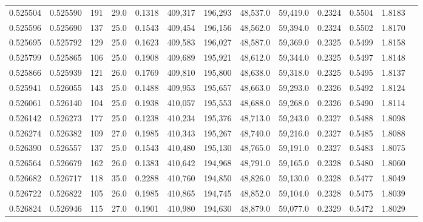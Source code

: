 \begin{tabular}{rrrrrrrrrrrrr}
0.525504 & 0.525590 &   191 & 29.0 &                                     0.1318 & 409,317 & 196,293 &  48,537.0 &  59,419.0 & 0.2324 & 0.5504 & 1.8183 \\
0.525596 & 0.525690 &   137 & 25.0 &                                     0.1543 & 409,454 & 196,156 &  48,562.0 &  59,394.0 & 0.2324 & 0.5502 & 1.8170 \\
0.525695 & 0.525792 &   129 & 25.0 &                                     0.1623 & 409,583 & 196,027 &  48,587.0 &  59,369.0 & 0.2325 & 0.5499 & 1.8158 \\
0.525799 & 0.525865 &   106 & 25.0 &                                     0.1908 & 409,689 & 195,921 &  48,612.0 &  59,344.0 & 0.2325 & 0.5497 & 1.8148 \\
0.525866 & 0.525939 &   121 & 26.0 &                                     0.1769 & 409,810 & 195,800 &  48,638.0 &  59,318.0 & 0.2325 & 0.5495 & 1.8137 \\
0.525941 & 0.526055 &   143 & 25.0 &                                     0.1488 & 409,953 & 195,657 &  48,663.0 &  59,293.0 & 0.2326 & 0.5492 & 1.8124 \\
0.526061 & 0.526140 &   104 & 25.0 &                                     0.1938 & 410,057 & 195,553 &  48,688.0 &  59,268.0 & 0.2326 & 0.5490 & 1.8114 \\
0.526142 & 0.526273 &   177 & 25.0 &                                     0.1238 & 410,234 & 195,376 &  48,713.0 &  59,243.0 & 0.2327 & 0.5488 & 1.8098 \\
0.526274 & 0.526382 &   109 & 27.0 &                                     0.1985 & 410,343 & 195,267 &  48,740.0 &  59,216.0 & 0.2327 & 0.5485 & 1.8088 \\
0.526390 & 0.526557 &   137 & 25.0 &                                     0.1543 & 410,480 & 195,130 &  48,765.0 &  59,191.0 & 0.2327 & 0.5483 & 1.8075 \\
0.526564 & 0.526679 &   162 & 26.0 &                                     0.1383 & 410,642 & 194,968 &  48,791.0 &  59,165.0 & 0.2328 & 0.5480 & 1.8060 \\
0.526682 & 0.526717 &   118 & 35.0 &                                     0.2288 & 410,760 & 194,850 &  48,826.0 &  59,130.0 & 0.2328 & 0.5477 & 1.8049 \\
0.526722 & 0.526822 &   105 & 26.0 &                                     0.1985 & 410,865 & 194,745 &  48,852.0 &  59,104.0 & 0.2328 & 0.5475 & 1.8039 \\
0.526824 & 0.526946 &   115 & 27.0 &                                     0.1901 & 410,980 & 194,630 &  48,879.0 &  59,077.0 & 0.2329 & 0.5472 & 1.8029 \\

\end{tabular}

